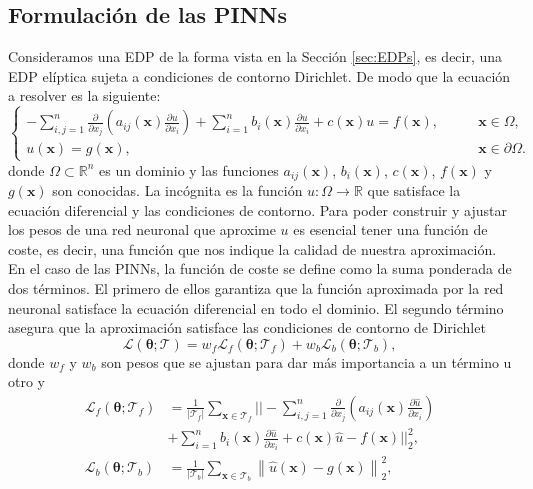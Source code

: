 \documentclass[a4paper,11pt,spanish, twoside, leqno]{tfg-uam}
\theoremstyle{definition}
\begin{document}
\subsection{Formulación de las PINNs}
Consideramos una EDP de la forma vista en la Sección \ref{sec:EDPs}, es decir, una EDP elíptica sujeta a condiciones de contorno Dirichlet. De modo que la ecuación a resolver es la siguiente: 
\begin{equation} 
    \begin{cases} -\sum_{i,j=1}^{n} \frac{\partial}{\partial x_j}\left( a_{ij}(\mathbf{x})\frac{\partial u}{\partial x_i}\right) + \sum_{i=1}^{n} b_i(\mathbf{x})\frac{\partial u}{\partial x_i} + c(\mathbf{x})u = f(\mathbf{x}), &\qquad \mathbf{x}\in\Omega,\\ u(\mathbf{x}) = g(\mathbf{x}), &\qquad \mathbf{x}\in\partial\Omega. 
    \end{cases} 
\end{equation} 
donde $\Omega \subset \mathbb{R}^n$ es un dominio y las funciones $a_{ij}(\mathbf{x})$, $b_i(\mathbf{x})$, $c(\mathbf{x})$, $f(\mathbf{x})$ y $g(\mathbf{x})$ son conocidas. La incógnita es la función $u: \Omega \to \mathbb{R}$ que satisface la ecuación diferencial y las condiciones de contorno. Para poder construir y ajustar los pesos de una red neuronal que aproxime $u$ es esencial tener una función de coste, es decir, una función que nos indique la calidad de nuestra aproximación. En el caso de las PINNs, la función de coste se define como la suma ponderada de dos términos. El primero de ellos garantiza que la función aproximada por la red neuronal satisface la ecuación diferencial en todo el dominio. El segundo término asegura que la aproximación satisface las condiciones de contorno de Dirichlet
\begin{equation} \label{eq:L_PINN}
    \mathcal{L}(\boldsymbol{\theta}; \mathcal{T}) = w_f \mathcal{L}_f(\boldsymbol{\theta}; \mathcal{T}_f) + w_b \mathcal{L}_b(\boldsymbol{\theta}; \mathcal{T}_b),
\end{equation}
donde $w_f$ y $w_b$ son pesos que se ajustan para dar más importancia a un término u otro y
\begin{equation}
    \label{eq:Lf_Lb}
    \begin{split}
        \mathcal{L}_f(\boldsymbol{\theta}; \mathcal{T}_f) &= \frac{1}{|\mathcal{T}_f|} \sum_{\mathbf{x} \in \mathcal{T}_f} || -\sum_{i,j=1}^{n} \frac{\partial}{\partial x_j}\left( a_{ij}(\mathbf{x})\frac{\partial \hat{u}}{\partial x_i}\right) \\ &+ \sum_{i=1}^{n} b_i(\mathbf{x})\frac{\partial \hat{u}}{\partial x_i} + c(\mathbf{x})\hat{u} - f(\mathbf{x}) ||_2^2, \\ 
        \mathcal{L}_b(\boldsymbol{\theta}; \mathcal{T}_b) &= \frac{1}{|\mathcal{T}_b|} \sum_{\mathbf{x} \in \mathcal{T}_b} \left\| \hat{u} (\mathbf{x}) - g(\mathbf{x})\right\|_2^2,
    \end{split}
\end{equation}
    
\end{document}
